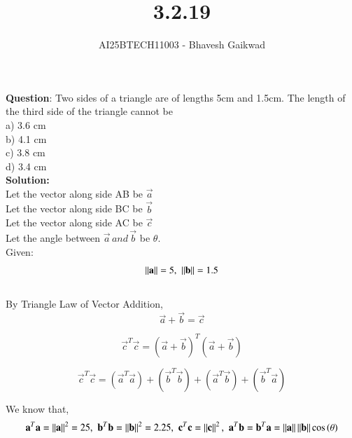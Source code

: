 \documentclass[journal]{IEEEtran}
\begin{document}

\vspace{3cm}

\title{3.2.19}
\author{AI25BTECH11003 - Bhavesh Gaikwad}
{\let\newpage\relax\maketitle}

\renewcommand{\thefigure}{\theenumi}
\renewcommand{\thetable}{\theenumi}
\setlength{\intextsep}{10pt} 


\renewcommand{\thetable}{\theenumi}


\textbf{Question}: Two sides of a triangle are of lengths 5cm and 1.5cm. The length of the third side of the triangle cannot be\\
a) 3.6 cm\\
b) 4.1 cm\\
c) 3.8 cm\\
d) 3.4 cm\\

\textbf{Solution:}\\

Let the vector along side AB be $\vec{a}$ \\
Let the vector along side BC be $\vec{b}$ \\
Let the vector along side AC be $\vec{c}$ \\
Let the angle between $\vec{a} \, and \, \vec{b}$ be $\theta$.\\

Given: 
\begin{equation}
    \left\lVert\mathbf{a}\right\rVert = 5, \, \, \left\lVert\mathbf{b}\right\rVert = 1.5
\end{equation}\\

By Triangle Law of Vector Addition,
\begin{equation}
    \vec{a} + \vec{b} = \vec{c}
\end{equation}

\begin{equation}
\vec{c}^T\vec{c} = (\vec{a}+\vec{b})^T(\vec{a}+\vec{b})    
\end{equation}

\begin{equation}
    \vec{c}^T\vec{c} = (\vec{a}^T\vec{a}) + (\vec{b}^T\vec{b}) + (\vec{a}^T\vec{b}) + (\vec{b}^T\vec{a})
\end{equation}

We know that,
\begin{equation}
    \mathbf{a}^T\mathbf{a}= \left\lVert\mathbf{a}\right\rVert^2 = 25, \, \,
    \mathbf{b}^T\mathbf{b} = \left\lVert\mathbf{b}\right\rVert^2 = 2.25, \, \,
    \mathbf{c}^T\mathbf{c}=\left\lVert\mathbf{c}\right\rVert^2, \, \,
   \mathbf{a}^T\mathbf{b}=\mathbf{b}^T\mathbf{a}=\left\lVert\mathbf{a}\right\rVert\left\lVert\mathbf{b}\right\rVert\cos{(\theta)}
\end{equation}
\end{document}
